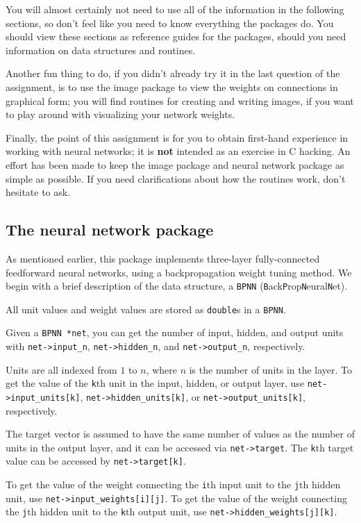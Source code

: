 You will almost certainly not need to use all of the information
in the following sections, so don't feel like you need to know
everything the packages do.  You should view these sections
as reference guides for the packages, should you need information
on data structures and routines.

Another fun thing to do, if you didn't already try it in the last
question of the assignment, is to use the image package
to view the weights on connections in graphical form; you will find
routines for creating and writing images, if you want to play around
with visualizing your network weights.

Finally, the point of this assignment is for you to obtain first-hand
experience in working with neural networks; it is {\bf not} intended as an
exercise in C hacking.  An effort has been made to keep the image package
and neural network package as simple as possible.  If you need
clarifications about how the routines work, don't hesitate to ask.

\subsection{The neural network package}

As mentioned earlier, this package implements three-layer fully-connected
feedforward neural networks, using a backpropagation weight tuning
method.  We begin with a brief description of the data structure,
a {\tt BPNN} ({\tt B}ack{\tt P}rop{\tt N}eural{\tt N}et).

All unit values and weight values are stored as {\tt double}s in a
{\tt BPNN}.

Given a {\tt BPNN *net}, you can get the number of input, hidden,
and output units with {\tt net->input\_n}, {\tt net->hidden\_n},
and {\tt net->output\_n}, respectively.

Units are all indexed from $1$ to $n$,
where $n$ is the number of units in the layer.  To get the value
of the {\tt k}th unit in the input, hidden, or output layer, use
{\tt net->input\_units[k]}, {\tt net->hidden\_units[k]}, or
{\tt net->output\_units[k]}, respectively.

The target vector is assumed to have the same number of values as the number
of units in the output layer, and it can be accessed via {\tt net->target}.
The {\tt k}th target value can be accessed by {\tt net->target[k]}.

To get the value of the weight connecting the {\tt i}th input unit
to the {\tt j}th hidden unit, use {\tt net->input\_weights[i][j]}.
To get the value of the weight connecting the {\tt j}th hidden unit
to the {\tt k}th output unit, use {\tt net->hidden\_weights[j][k]}.

